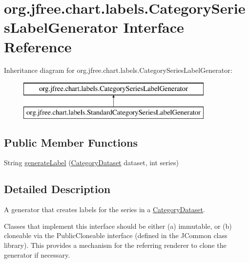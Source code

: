 \hypertarget{interfaceorg_1_1jfree_1_1chart_1_1labels_1_1_category_series_label_generator}{}\section{org.\+jfree.\+chart.\+labels.\+Category\+Series\+Label\+Generator Interface Reference}
\label{interfaceorg_1_1jfree_1_1chart_1_1labels_1_1_category_series_label_generator}
Inheritance diagram for org.\+jfree.\+chart.\+labels.\+Category\+Series\+Label\+Generator\+:\begin{figure}[H]
\begin{center}
\leavevmode
\includegraphics[height=2.000000cm]{interfaceorg_1_1jfree_1_1chart_1_1labels_1_1_category_series_label_generator}
\end{center}
\end{figure}
\subsection*{Public Member Functions}
\begin{DoxyCompactItemize}
\item 
String \mbox{\hyperlink{interfaceorg_1_1jfree_1_1chart_1_1labels_1_1_category_series_label_generator_a7b6ff7a5a11c77b3a2cede3b31dd314f}{generate\+Label}} (\mbox{\hyperlink{interfaceorg_1_1jfree_1_1data_1_1category_1_1_category_dataset}{Category\+Dataset}} dataset, int series)
\end{DoxyCompactItemize}


\subsection{Detailed Description}
A generator that creates labels for the series in a \mbox{\hyperlink{}{Category\+Dataset}}. 

Classes that implement this interface should be either (a) immutable, or (b) cloneable via the {\ttfamily Public\+Cloneable} interface (defined in the J\+Common class library). This provides a mechanism for the referring renderer to clone the generator if necessary. 

